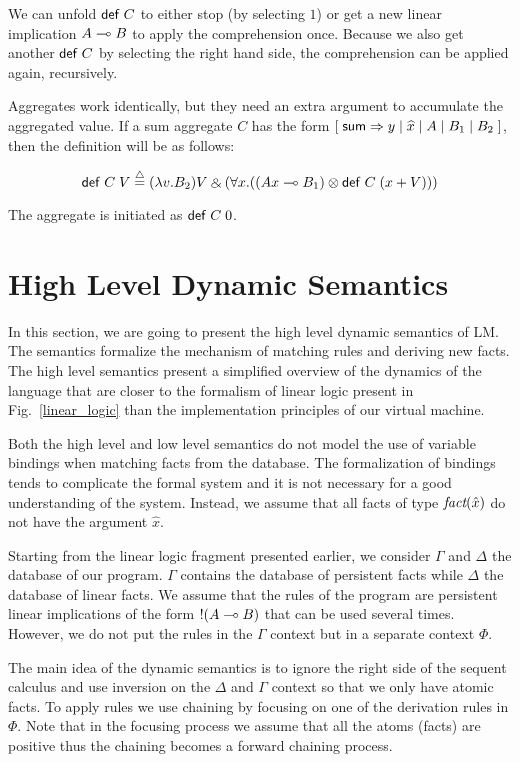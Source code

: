 We can unfold $\mathsf{def} \; C$ to either stop (by selecting $1$) or get a new linear implication $A \multimap B$
to apply the comprehension once. Because we also get another $\mathsf{def} \; C$ by selecting the right hand side,
the comprehension can be applied again, recursively.

Aggregates work identically, but they need an extra argument to accumulate the aggregated value. If a sum aggregate $C$ has the form $[\;\mathsf{sum} \Rightarrow y \; | \; \widehat{x} \; | \; A \; | \; B_1 \; | \; B_2 \;]$, then the definition will be as follows:

\[
\compr{C} \; V \defeq (\lambda v. B_2)V \with (\forall x. ((Ax \lolli B_1) \otimes \compr{C} \; (x + V)))
\]

The aggregate is initiated as $\mathsf{def} \; C \; 0$.

\section{High Level Dynamic Semantics}

In this section, we are going to present the high level dynamic semantics of LM. The semantics
formalize the mechanism of matching rules and deriving new facts. The high level semantics
present a simplified overview of the dynamics of the language that are closer to the formalism
of linear logic present in Fig.~\ref{linear_logic} than the implementation principles of our
virtual machine.

Both the high level and low level semantics do not model the use of variable bindings when matching
facts from the database. The formalization of bindings tends to complicate the formal system and it is not
necessary for a good understanding of the system. Instead, we assume that all facts of
type $\emph{fact}(\hat{x})$ do not have the argument $\hat{x}$.

Starting from the linear logic fragment presented earlier, we consider $\Gamma$ and $\Delta$ the database
of our program. $\Gamma$ contains the database of persistent facts while $\Delta$ the database of linear
facts. We assume that the rules of the program are persistent linear implications of the form
${!} (A \multimap B)$ that can be used several times. However, we do not put the rules in the $\Gamma$
context but in a separate context $\Phi$.

The main idea of the dynamic semantics is to ignore the right side of the sequent calculus
and use inversion on the $\Delta$ and $\Gamma$ context so that we only have atomic facts.
To apply rules we use chaining by focusing on one of the derivation rules in $\Phi$. Note
that in the focusing process we assume that all the atoms (facts) are positive thus the chaining
becomes a forward chaining process.

